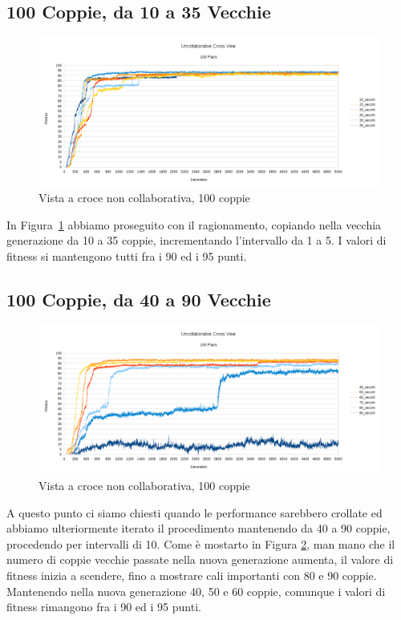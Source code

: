 \clearpage

\subsection{100 Coppie, da 10 a 35 Vecchie}
\begin{figure}[ht]
	\centering
	\includegraphics[scale=0.7,angle=90]{imgs/uncollaborative_cross_100_pairs_10_35_vecchi.png}
	\caption{Vista a croce non collaborativa, 100 coppie}
	\label{figure:uncoll_cross_100_10_35}
\end{figure}
In Figura~\ref{figure:uncoll_cross_100_10_35} abbiamo proseguito con il
ragionamento, copiando nella vecchia generazione da 10 a 35 coppie,
incrementando l'intervallo da 1 a 5. I valori di fitness si mantengono tutti fra
i 90 ed i 95 punti.

\subsection{100 Coppie, da 40 a 90 Vecchie}
\begin{figure}[ht]
	\centering
	\includegraphics[scale=0.7,angle=90]{imgs/uncollaborative_cross_100_pairs_40_90_vecchi.png}
	\caption{Vista a croce non collaborativa, 100 coppie}
	\label{figure:uncoll_cross_100_40_90}
\end{figure}
A questo punto ci siamo chiesti quando le performance sarebbero crollate ed
abbiamo ulteriormente iterato il procedimento mantenendo da 40 a 90 coppie,
procedendo per intervalli di 10. Come è mostarto in Figura
\ref{figure:uncoll_cross_100_40_90}, man mano che il numero di coppie vecchie
passate nella nuova generazione aumenta, il valore di fitness inizia a scendere,
fino a mostrare cali importanti con 80 e 90 coppie. Mantenendo nella nuova
generazione 40, 50 e 60 coppie, comunque i valori di fitness rimangono fra i 90
ed i 95 punti.

